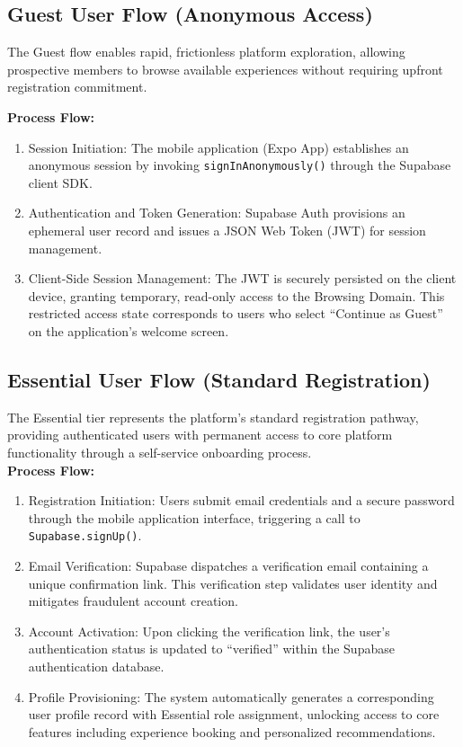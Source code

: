 \subsection{Guest User Flow (Anonymous Access)}
\label{subsection:Guest User Flow (Anonymous Access)}
The Guest flow enables rapid, frictionless platform exploration, allowing prospective members to browse available experiences without requiring upfront registration commitment.

\textbf{Process Flow:}
\begin{enumerate}
    \item Session Initiation: The mobile application (Expo App) establishes an anonymous session by invoking \texttt{signInAnonymously()} through the Supabase client SDK.
    \item Authentication and Token Generation: Supabase Auth provisions an ephemeral user record and issues a JSON Web Token (JWT) for session management.
    \item Client-Side Session Management: The JWT is securely persisted on the client device, granting temporary, read-only access to the Browsing Domain. This restricted access state corresponds to users who select ``Continue as Guest'' on the application's welcome screen.
\end{enumerate}

\subsection{Essential User Flow (Standard Registration)}
\label{subsection:Essential User Flow (Standard Registration)}
The Essential tier represents the platform's standard registration pathway, providing authenticated users with permanent access to core platform functionality through a self-service onboarding process. \\
\textbf{Process Flow:}
\begin{enumerate}
    \item Registration Initiation: Users submit email credentials and a secure password through the mobile application interface, triggering a call to \texttt{Supabase.signUp()}.
    \item Email Verification: Supabase dispatches a verification email containing a unique confirmation link. This verification step validates user identity and mitigates fraudulent account creation.
    \item Account Activation: Upon clicking the verification link, the user's authentication status is updated to ``verified'' within the Supabase authentication database.
    \item Profile Provisioning: The system automatically generates a corresponding user profile record with Essential role assignment, unlocking access to core features including experience booking and personalized recommendations.
\end{enumerate}

